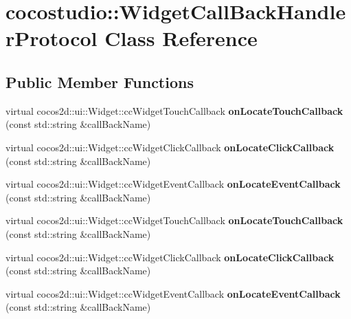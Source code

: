 \hypertarget{classcocostudio_1_1WidgetCallBackHandlerProtocol}{}\section{cocostudio\+:\+:Widget\+Call\+Back\+Handler\+Protocol Class Reference}
\label{classcocostudio_1_1WidgetCallBackHandlerProtocol}
\subsection*{Public Member Functions}
\begin{DoxyCompactItemize}
\item 
\mbox{\label{classcocostudio_1_1WidgetCallBackHandlerProtocol_aac69cde2591422a6f85dd3e6c853ba59}} 
virtual cocos2d\+::ui\+::\+Widget\+::cc\+Widget\+Touch\+Callback {\bfseries on\+Locate\+Touch\+Callback} (const std\+::string \&call\+Back\+Name)
\item 
\mbox{\label{classcocostudio_1_1WidgetCallBackHandlerProtocol_a44507f13fa41f7b14b5239d74e02c216}} 
virtual cocos2d\+::ui\+::\+Widget\+::cc\+Widget\+Click\+Callback {\bfseries on\+Locate\+Click\+Callback} (const std\+::string \&call\+Back\+Name)
\item 
\mbox{\label{classcocostudio_1_1WidgetCallBackHandlerProtocol_a792d8db7f51ed9c90ef53c77ba53b302}} 
virtual cocos2d\+::ui\+::\+Widget\+::cc\+Widget\+Event\+Callback {\bfseries on\+Locate\+Event\+Callback} (const std\+::string \&call\+Back\+Name)
\item 
\mbox{\label{classcocostudio_1_1WidgetCallBackHandlerProtocol_aca3e13e81895ec43cbdd6e91961521f3}} 
virtual cocos2d\+::ui\+::\+Widget\+::cc\+Widget\+Touch\+Callback {\bfseries on\+Locate\+Touch\+Callback} (const std\+::string \&call\+Back\+Name)
\item 
\mbox{\label{classcocostudio_1_1WidgetCallBackHandlerProtocol_ac26d79ed445c4469fb948f111ef8cb5e}} 
virtual cocos2d\+::ui\+::\+Widget\+::cc\+Widget\+Click\+Callback {\bfseries on\+Locate\+Click\+Callback} (const std\+::string \&call\+Back\+Name)
\item 
\mbox{\label{classcocostudio_1_1WidgetCallBackHandlerProtocol_ad5071a426fbe0784b90cd8f26390e981}} 
virtual cocos2d\+::ui\+::\+Widget\+::cc\+Widget\+Event\+Callback {\bfseries on\+Locate\+Event\+Callback} (const std\+::string \&call\+Back\+Name)
\end{DoxyCompactItemize}


